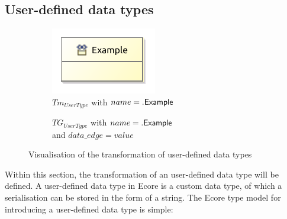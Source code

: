 \subsection{User-defined data types}
\label{subsec:library_of_transformations:type_level_transformations:user_defined_data_types}

\begin{figure}
    \centering
    \begin{subfigure}{0.45\textwidth}
        \centering
        \includegraphics{images/05_library_of_transformations/02_type_level_transformations/05_user_defined_data_types/userdatatype_type.pdf}
        \caption{$Tm_{UserType}$ with $name = .\mathsf{Example}$}
        \label{fig:library_of_transformations:type_level_transformations:user_defined_data_types:visualisation:ecore}
    \end{subfigure}
    \begin{subfigure}{0.45\textwidth}
        \centering
        
        \caption{$TG_{UserType}$ with $name = .\mathsf{Example}$\\ and $data\_\!edge = value$}
        \label{fig:library_of_transformations:type_level_transformations:user_defined_data_types:visualisation:groove}
    \end{subfigure}
    \caption{Visualisation of the transformation of user-defined data types}
    \label{fig:library_of_transformations:type_level_transformations:user_defined_data_types:visualisation}
\end{figure}

Within this section, the transformation of an user-defined data type will be defined. A user-defined data type in Ecore is a custom data type, of which a serialisation can be stored in the form of a string. The Ecore type model for introducing a user-defined data type is simple:

